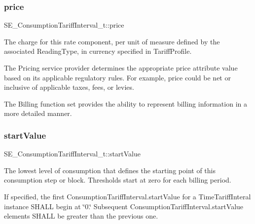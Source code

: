\subsubsection{\texorpdfstring{price}{price}}
{\footnotesize\ttfamily S\+E\+\_\+\+Consumption\+Tariff\+Interval\+\_\+t\+::price}

The charge for this rate component, per unit of measure defined by the associated Reading\+Type, in currency specified in Tariff\+Profile.

The Pricing service provider determines the appropriate price attribute value based on its applicable regulatory rules. For example, price could be net or inclusive of applicable taxes, fees, or levies.

The Billing function set provides the ability to represent billing information in a more detailed manner. \mbox{\label{group__ConsumptionTariffInterval_ga6bdef05db8c5f945867838c51904afc1}} 
\subsubsection{\texorpdfstring{start\+Value}{startValue}}
{\footnotesize\ttfamily S\+E\+\_\+\+Consumption\+Tariff\+Interval\+\_\+t\+::start\+Value}

The lowest level of consumption that defines the starting point of this consumption step or block. Thresholds start at zero for each billing period.

If specified, the first Consumption\+Tariff\+Interval.\+start\+Value for a Time\+Tariff\+Interal instance S\+H\+A\+LL begin at \char`\"{}0.\char`\"{} Subsequent Consumption\+Tariff\+Interval.\+start\+Value elements S\+H\+A\+LL be greater than the previous one. 